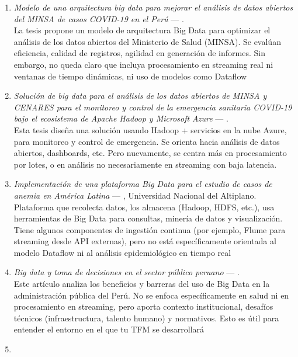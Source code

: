 \documentclass[12pt,a4paper]{article}
\providecommand{\tightlist}{%
  \setlength{\itemsep}{0pt}\setlength{\parskip}{0pt}}
\begin{document}
\begin{enumerate}

    \tightlist
    \item
          \emph{Modelo de una arquitectura big data para mejorar el análisis de datos abiertos del MINSA de casos COVID-19 en el Perú} --- \textcite{gomez2023modelo}.\\
          La tesis propone un modelo de arquitectura Big Data para optimizar el análisis de los datos abiertos del Ministerio de Salud (MINSA). Se evalúan eficiencia, calidad de registros, agilidad en generación de informes. Sin embargo, no queda claro que incluya procesamiento en streaming real ni ventanas de tiempo dinámicas, ni uso de modelos como Dataflow
    \item
          \emph{Solución de big data para el análisis de los datos abiertos de MINSA y CENARES para el monitoreo y control de la emergencia sanitaria COVID-19 bajo el ecosistema de Apache Hadoop y Microsoft Azure} --- \textcite{viteri2023solucion}.\\
          Esta tesis diseña una solución usando Hadoop + servicios en la nube Azure, para monitoreo y control de emergencia. Se orienta hacia análisis de datos abiertos, dashboards, etc. Pero nuevamente, se centra más en procesamiento por lotes, o en análisis no necesariamente en streaming con baja latencia.
    \item
          \emph{Implementación de una plataforma Big Data para el estudio de casos de anemia en América Latina} --- \textcite{bustamante2019implementacion}, Universidad Nacional del Altiplano.\\
          Plataforma que recolecta datos, los almacena (Hadoop, HDFS, etc.), usa herramientas de Big Data para consultas, minería de datos y visualización. Tiene algunos componentes de ingestión continua (por ejemplo, Flume para streaming desde API externas), pero no está específicamente orientada al modelo Dataflow ni al análisis epidemiológico en tiempo real
    \item
          \emph{Big data y toma de decisiones en el sector público peruano} --- \textcite{guillen2025big}.\\
          Este artículo analiza los beneficios y barreras del uso de Big Data en la administración pública del Perú. No se enfoca específicamente en salud ni en procesamiento en streaming, pero aporta contexto institucional, desafíos técnicos (infraestructura, talento humano) y normativos. Esto es útil para entender el entorno en el que tu TFM se desarrollará
    \item

\end{enumerate}
\end{document}
